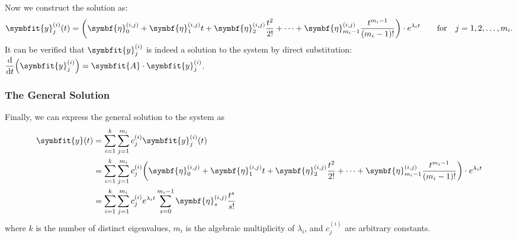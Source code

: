 \documentclass[10pt,UTF8]{article}
\newcommand{\mat}[1]{\symbfit{#1}}
\renewcommand{\vec}[1]{%
  \ifnum0\ifcat#1a1\else0\fi>0
  \symbfit{#1}  %
  \else
  \symbf{#1}  %
  \fi
}
\theoremstyle{definition}
\newtheorem{definition inner}{Definition}[section]
\theoremstyle{definition}
\newtheorem{theorem inner}{Theorem}[section]
\theoremstyle{definition}
\newtheorem*{proof inner}{\textit{Proof}}
\theoremstyle{plain}
\newtheorem{tip inner}{Tip}[section]
\theoremstyle{remark}
\begin{document}
Now we construct the solution as:
\begin{equation*}
  \vec{y}^{(i)}_j(t) = \qty(
    \vec{\eta}^{(i,j)}_0 +
    \vec{\eta}^{(i,j)}_1 t +
    \vec{\eta}^{(i,j)}_2 \frac{t^2}{2!} + \cdots +
    \vec{\eta}^{(i,j)}_{m_i-1} \frac{t^{m_i-1}}{(m_i-1)!}
  ) \cdot e^{\lambda_i t}
  \quad\qfor j = 1, 2, \ldots, m_i.
\end{equation*}
It can be verified that \(\vec{y}^{(i)}_j\) is indeed a
solution to the system by direct substitution:
\(\displaystyle \dv{t}(\vec{y}^{(i)}_j)=\mat{A} \cdot \vec{y}^{(i)}_j\).

\subsubsection*{The General Solution}

Finally, we can express the general solution to the system as
\begin{align*}
  \vec{y}(t) &= \sum_{i=1}^k \sum_{j=1}^{m_i} c^{(i)}_j \vec{y}^{(i)}_j(t) \\
  &= \sum_{i=1}^k \sum_{j=1}^{m_i} c^{(i)}_j
  \qty(
    \vec{\eta}^{(i,j)}_0 +
    \vec{\eta}^{(i,j)}_1 t +
    \vec{\eta}^{(i,j)}_2 \frac{t^2}{2!} + \cdots +
    \vec{\eta}^{(i,j)}_{m_i-1} \frac{t^{m_i-1}}{(m_i-1)!}
  ) \cdot e^{\lambda_i t} \\
  &= \sum_{i=1}^k \sum_{j=1}^{m_i} c^{(i)}_j e^{\lambda_i t}
  \sum_{s=0}^{m_i-1} \vec{\eta}^{(i,j)}_s \frac{t^s}{s!}
\end{align*}
where \(k\) is the number of distinct eigenvalues,
\(m_i\) is the algebraic multiplicity of \(\lambda_i\),
and \(c^{(i)}_j\) are arbitrary constants.
\end{document}
